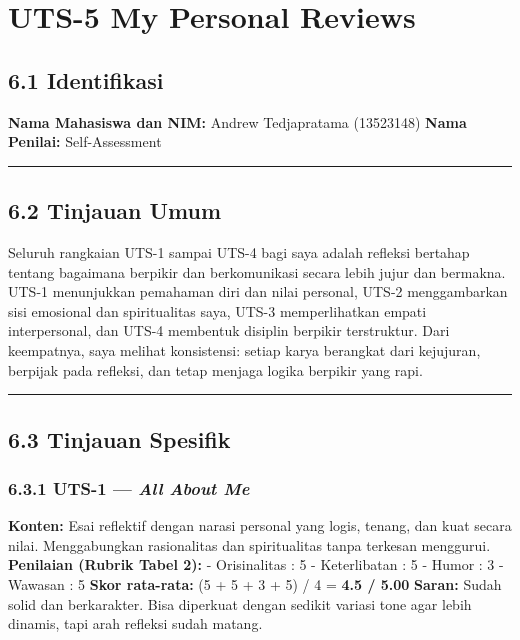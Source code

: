 \documentclass[
  letterpaper,
  DIV=11,
  numbers=noendperiod]{scrreprt}
\begin{document}

\chapter{UTS-5 My Personal Reviews}\label{uts-5-my-personal-reviews}

\section{6.1 Identifikasi}\label{identifikasi}

\textbf{Nama Mahasiswa dan NIM:} Andrew Tedjapratama (13523148)
\textbf{Nama Penilai:} Self-Assessment

\begin{center}\rule{0.5\linewidth}{0.5pt}\end{center}

\section{6.2 Tinjauan Umum}\label{tinjauan-umum}

Seluruh rangkaian UTS-1 sampai UTS-4 bagi saya adalah refleksi bertahap
tentang bagaimana berpikir dan berkomunikasi secara lebih jujur dan
bermakna. UTS-1 menunjukkan pemahaman diri dan nilai personal, UTS-2
menggambarkan sisi emosional dan spiritualitas saya, UTS-3
memperlihatkan empati interpersonal, dan UTS-4 membentuk disiplin
berpikir terstruktur. Dari keempatnya, saya melihat konsistensi: setiap
karya berangkat dari kejujuran, berpijak pada refleksi, dan tetap
menjaga logika berpikir yang rapi.

\begin{center}\rule{0.5\linewidth}{0.5pt}\end{center}

\section{6.3 Tinjauan Spesifik}\label{tinjauan-spesifik}

\subsection{\texorpdfstring{6.3.1 UTS-1 --- \emph{All About
Me}}{6.3.1 UTS-1 --- All About Me}}\label{uts-1-all-about-me-1}

\textbf{Konten:} Esai reflektif dengan narasi personal yang logis,
tenang, dan kuat secara nilai. Menggabungkan rasionalitas dan
spiritualitas tanpa terkesan menggurui. \textbf{Penilaian (Rubrik Tabel
2):} - Orisinalitas : 5 - Keterlibatan : 5 - Humor : 3 - Wawasan : 5
\textbf{Skor rata-rata:} (5 + 5 + 3 + 5) / 4 = \textbf{4.5 / 5.00}
\textbf{Saran:} Sudah solid dan berkarakter. Bisa diperkuat dengan
sedikit variasi tone agar lebih dinamis, tapi arah refleksi sudah
matang.
\end{document}
